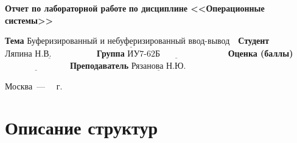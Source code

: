 \documentclass[12pt]{report}
\begin{document}
\begin{titlepage}
		\begin{center}
			\noindent\begin{minipage}{1.1\textwidth}\centering
				\Large\textbf{  Отчет по лабораторной работе }\newline
				\textbf{по дисциплине <<Операционные системы>>}\newline
			\end{minipage}
		\end{center}
		
		\noindent\textbf{Тема} $\underline{\text{Буферизированный и небуферизированный ввод-вывод~~}}$\newline\newline
		\noindent\textbf{Студент} $\underline{\text{Ляпина Н.В.~~~~~~~~~~~~~~~}}$\newline\newline
		\noindent\textbf{Группа} $\underline{\text{ИУ7-62Б~~~~~~~~~~~~~~~~~~~~~~~}}$\newline\newline
		\noindent\textbf{Оценка (баллы)} $\underline{\text{~~~~~~~~~~~~~~~~~~~~~~}}$\newline\newline
		\noindent\textbf{Преподаватель} $\underline{\text{Рязанова Н.Ю.}}$\newline\newline\newline
		
		\begin{center}
			\vfill
			Москва~---~\the\year
			~г.
		\end{center}
	\end{titlepage}
\setcounter{page}{2}

\section*{Описание структур}
\end{document}
